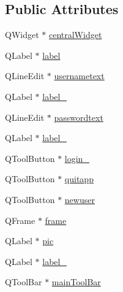 \subsection*{Public Attributes}
\begin{DoxyCompactItemize}
\item 
Q\-Widget $\ast$ \hyperlink{classUi__login_a305d3342033a2a8a4ae198dd877fc32b}{central\-Widget}
\item 
Q\-Label $\ast$ \hyperlink{classUi__login_a4c0d02992de5f164908ec9c0212fce9e}{label}
\item 
Q\-Line\-Edit $\ast$ \hyperlink{classUi__login_a8a6b452a7614a498cf5de6121e6df31b}{usernametext}
\item 
Q\-Label $\ast$ \hyperlink{classUi__login_aafa8b63c8fb67dbe235558b4eb0a4d1b}{label\-\_}
\item 
Q\-Line\-Edit $\ast$ \hyperlink{classUi__login_a3f80631086d015dbbbf76e63ad7f9b4a}{passwordtext}
\item 
Q\-Label $\ast$ \hyperlink{classUi__login_a9dd6304aaa11bf305644656b13163538}{label\-\_}
\item 
Q\-Tool\-Button $\ast$ \hyperlink{classUi__login_a1f3f3b0be6255ad88f514072d7908254}{login\-\_}
\item 
Q\-Tool\-Button $\ast$ \hyperlink{classUi__login_a5c658c9c82384b36f181f89e39fb01f5}{quitapp}
\item 
Q\-Tool\-Button $\ast$ \hyperlink{classUi__login_a02c41747f3e1ab566608d295385e480e}{newuser}
\item 
Q\-Frame $\ast$ \hyperlink{classUi__login_adde4eaecbf3f162fe45feb193899fbc8}{frame}
\item 
Q\-Label $\ast$ \hyperlink{classUi__login_a6767a39e4c6308ca8a8d753a7a71b9e3}{pic}
\item 
Q\-Label $\ast$ \hyperlink{classUi__login_af57fdff00409b4f16d2ff383f2ec3d7b}{label\-\_}
\item 
Q\-Tool\-Bar $\ast$ \hyperlink{classUi__login_ae224aefd56c05fa49b33a6310ddc24ee}{main\-Tool\-Bar}
\end{DoxyCompactItemize}


